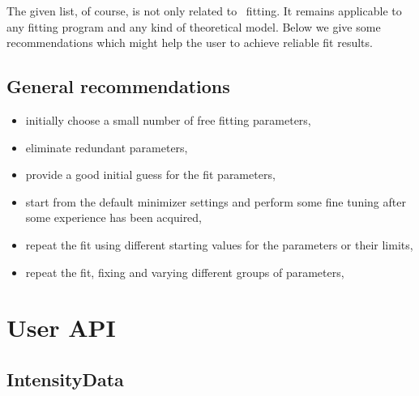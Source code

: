 The given list, of course, is not only related to \BornAgain\
fitting. It remains applicable to any fitting program and any kind of theoretical model.
 Below we give some recommendations which might help the user to achieve reliable fit results.

\subsection*{General recommendations}
\begin{itemize}
\item initially choose  a small number of free fitting parameters,
\item eliminate redundant parameters,
\item provide a good initial guess for the fit parameters,
\item start from the default minimizer settings and perform some fine tuning after some experience has been acquired,
\item repeat the fit using different starting values for the parameters or their limits,
\item repeat the fit, fixing and varying different groups of parameters,
\end{itemize}




\section{User API} \label{UserAPI}

\subsection{IntensityData}

